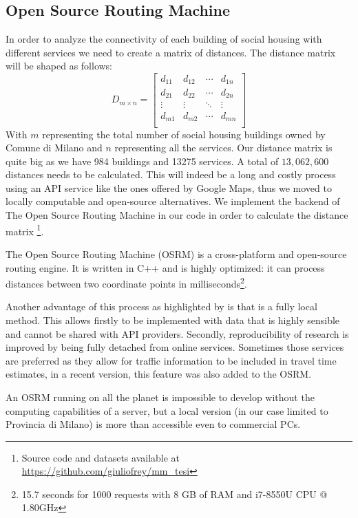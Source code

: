\documentclass[12pt]{article}
\begin{document}
\subsection{Open Source Routing Machine}
\label{OSRM}
In order to analyze the connectivity of each building of social housing with different services we need to create a matrix of distances. The distance matrix will be shaped as follows:
\[
D_{m\times n} =
\left[ {\begin{array}{cccc}
		d_{11} & d_{12} & \cdots & d_{1n}\\
		d_{21} & d_{22} & \cdots & d_{2n}\\
		\vdots & \vdots & \ddots & \vdots\\
		d_{m1} & d_{m2} & \cdots & d_{mn}\\
\end{array} } \right]
\]
With $m$ representing the total number of social housing buildings owned by Comune di Milano and $n$ representing all the services. Our distance matrix is quite big as we have 984 buildings and 13275 services. A total of $13,062,600$ distances needs to be calculated. This will indeed be a long and costly process using an API service like the ones offered by Google Maps, thus we moved to locally computable and open-source alternatives. We implement the backend of The Open Source Routing Machine \parencite{luxen-vetter-2011} in our code in order to calculate the distance matrix \footnote{Source code and datasets available at \url{https://github.com/giuliofrey/mm_tesi}}. 

The Open Source Routing Machine (OSRM) is a cross-platform and open-source routing engine. It is written in C++ and is highly optimized: it can process distances between two coordinate points in milliseconds\footnote{15.7 seconds for 1000 requests with 8 GB of RAM and i7-8550U CPU @ 1.80GHz}. 

Another advantage of this process as highlighted by \cite{Huber2016} is that is a fully local method. This allows firstly to be implemented with data that is highly sensible and cannot be shared with API providers. Secondly, reproducibility of research is improved by being fully detached from online services. Sometimes those services are preferred as they allow for traffic information to be included in travel time estimates, in a recent version, this feature was also added to the OSRM. 

An OSRM running on all the planet is impossible to develop without the computing capabilities of a server, but a local version (in our case limited to Provincia di Milano) is more than accessible even to commercial PCs.
\end{document}
